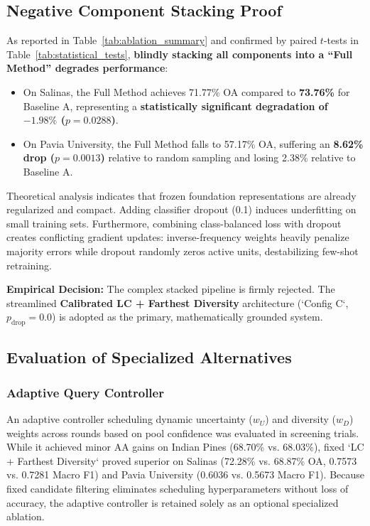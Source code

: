 \documentclass[conference,letterpaper]{IEEEtran}
\begin{document}
\subsection{Negative Component Stacking Proof}
As reported in Table~\ref{tab:ablation_summary} and confirmed by paired $t$-tests in Table~\ref{tab:statistical_tests}, \textbf{blindly stacking all components into a ``Full Method'' degrades performance}:
\begin{itemize}
    \item On Salinas, the Full Method achieves 71.77\% OA compared to \textbf{73.76\%} for Baseline A, representing a \textbf{statistically significant degradation of $-1.98\%$ ($p = 0.0288$)}.
    \item On Pavia University, the Full Method falls to 57.17\% OA, suffering an \textbf{8.62\% drop ($p = 0.0013$)} relative to random sampling and losing 2.38\% relative to Baseline A.
\end{itemize}

\vspace{0.3em}
Theoretical analysis indicates that frozen foundation representations are already regularized and compact. Adding classifier dropout (0.1) induces underfitting on small training sets. Furthermore, combining class-balanced loss with dropout creates conflicting gradient updates: inverse-frequency weights heavily penalize majority errors while dropout randomly zeros active units, destabilizing few-shot retraining. 

\vspace{0.3em}
\textbf{Empirical Decision:} The complex stacked pipeline is firmly rejected. The streamlined \textbf{Calibrated LC + Farthest Diversity} architecture (`Config C`, $p_{\text{drop}}=0.0$) is adopted as the primary, mathematically grounded system.

\subsection{Evaluation of Specialized Alternatives}
\subsubsection{Adaptive Query Controller}
An adaptive controller scheduling dynamic uncertainty ($w_U$) and diversity ($w_D$) weights across rounds based on pool confidence was evaluated in screening trials. While it achieved minor AA gains on Indian Pines (68.70\% vs. 68.03\%), fixed `LC + Farthest Diversity` proved superior on Salinas (72.28\% vs. 68.87\% OA, 0.7573 vs. 0.7281 Macro F1) and Pavia University (0.6036 vs. 0.5673 Macro F1). Because fixed candidate filtering eliminates scheduling hyperparameters without loss of accuracy, the adaptive controller is retained solely as an optional specialized ablation.
\end{document}
